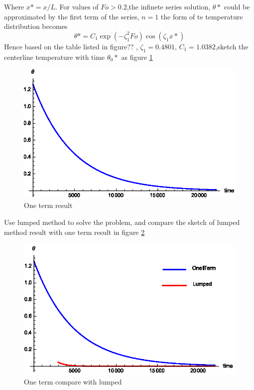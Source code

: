 \begin{solution}
Where $x*=x/L$.
For values of $Fo>0.2$,the infinete series solution, $\theta*$ could be approximated by the first term of the series, $n=1$
the form of te temperature distribution becomes
$$\theta*=C_1\exp(-\zeta^2_1Fo)\cos(\zeta_1x*)$$
Hence based on the table listed in figure?? , $\zeta_{1}=0.4801$, $C_1=1.0382$,sketch the centerline temperature with time $\theta_0*$ as figure \ref{fig:4:10}
\begin{figure}[H]
  \centering
    \includegraphics[scale=1]{figures/ch4/10}
    \caption{One term result}
    \label{fig:4:10}
\end{figure}
Use lumped method to solve the problem, and compare the sketch of lumped method result with one term result in figure \ref{fig:4:11}
\begin{figure}[H]
  \centering
    \includegraphics[scale=1]{figures/ch4/11}
    \caption{One term compare with lumped}
    \label{fig:4:11}
\end{figure}
\end{solution}





